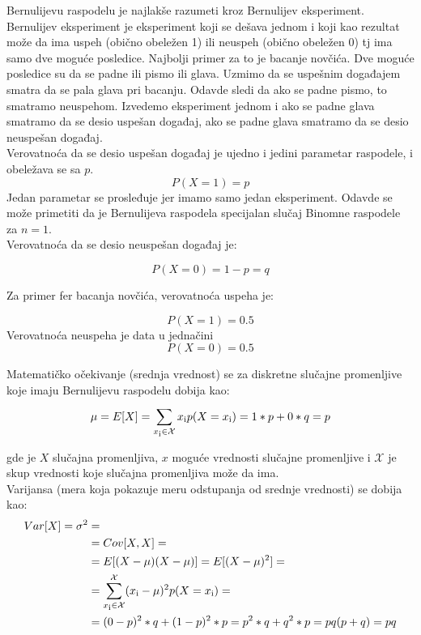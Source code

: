 \documentclass[a4paper,12pt]{report}
\begin{document}
Bernulijevu raspodelu je najlakše razumeti kroz Bernulijev eksperiment. Bernulijev eksperiment je eksperiment koji se dešava jednom i koji kao rezultat može da ima uspeh (obično obeležen 1) ili neuspeh (obično obeležen 0) tj ima samo dve moguće posledice. Najbolji primer za to je bacanje novčića. Dve moguće posledice su da se padne ili pismo ili glava. Uzmimo da se uspešnim događajem smatra da se pala glava pri bacanju. Odavde sledi da ako se padne pismo, to smatramo neuspehom. Izvedemo eksperiment jednom i ako se padne glava smatramo da se desio uspešan događaj, ako se padne glava smatramo da se desio neuspešan događaj. \\

Verovatnoća da se desio uspešan događaj je ujedno i jedini parametar raspodele, i obeležava se sa $p$.
  \begin{equation}
	 P(X = 1) = p 
 \end{equation}
Jedan parametar se prosleđuje jer imamo samo jedan eksperiment. Odavde se može primetiti da je Bernulijeva raspodela specijalan slučaj Binomne raspodele za $n = 1$.\\

Verovatnoća da se desio neuspešan događaj je:

\begin{equation}
	 P(X = 0) = 1-p = q 
 \end{equation}

Za primer fer bacanja novčića, verovatnoća uspeha je:

  \begin{equation}
	 P(X = 1) = 0.5 
 \end{equation}
Verovatnoća neuspeha je data u jednačini
  \begin{equation}
	 P(X = 0) = 0.5 
 \end{equation}
 
Matematičko očekivanje (srednja vrednost) se za diskretne slučajne promenljive koje imaju Bernulijevu raspodelu dobija kao:  
   \begin{equation}
	 \mu = E[X] = \sum_{x\textsubscript{i} \in \mathcal{X}}^{} x\textsubscript{i} p(X = x\textsubscript{i}) = 1 * p + 0 * q = p
 \end{equation}

gde je $X$ slučajna promenljiva, $x$ moguće vrednosti slučajne promenljive i $\mathcal{X}$ je skup vrednosti koje slučajna promenljiva može da ima.\\

Varijansa (mera koja pokazuje meru odstupanja od srednje vrednosti) se dobija kao:
\begin{equation}
\begin{split}
Var[X] = \sigma^2 & =  \\
& = Cov[X, X] = \\
& = E[(X - \mu)(X - \mu)] = E[(X - \mu)^2] = \\ 
& = \sum_{x\textsubscript{i} \in \mathcal{X}}^{\mathcal{X}} (x\textsubscript{i} - \mu)^2 p(X = x\textsubscript{i}) = \\
& = (0 - p)^2 * q + (1 - p)^2 * p = p^2*q +  q^2*p = pq (p + q) = pq
 \end{split}
 \end{equation}
 
\end{document}

